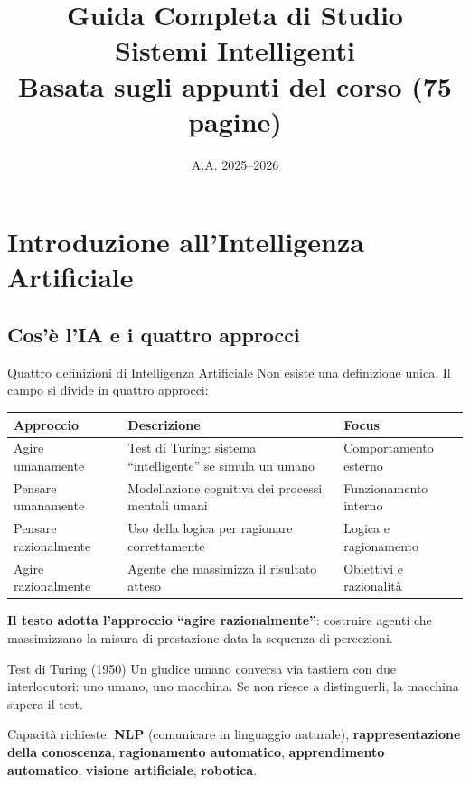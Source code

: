 \documentclass[12pt,a4paper]{article}
\title{\textbf{Guida Completa di Studio}\\[6pt]
{\large Sistemi Intelligenti}\\[4pt]
\normalsize Basata sugli appunti del corso (75 pagine)}
\author{}
\date{A.A. 2025--2026}
\begin{document}
\maketitle
\tableofcontents
\newpage

\section{Introduzione all'Intelligenza Artificiale}

\subsection{Cos'è l'IA e i quattro approcci}

\begin{defbox}{Quattro definizioni di Intelligenza Artificiale}
Non esiste una definizione unica. Il campo si divide in quattro approcci:

\begin{center}
\renewcommand{\arraystretch}{1.3}
\begin{tabular}{|p{3.5cm}|p{6cm}|p{3cm}|}
\hline
\textbf{Approccio} & \textbf{Descrizione} & \textbf{Focus} \\
\hline
Agire umanamente & Test di Turing: sistema ``intelligente'' se simula un umano & Comportamento esterno \\
\hline
Pensare umanamente & Modellazione cognitiva dei processi mentali umani & Funzionamento interno \\
\hline
Pensare razionalmente & Uso della logica per ragionare correttamente & Logica e ragionamento \\
\hline
Agire razionalmente & Agente che massimizza il risultato atteso & Obiettivi e razionalità \\
\hline
\end{tabular}
\end{center}

\textbf{Il testo adotta l'approccio ``agire razionalmente''}: costruire agenti che massimizzano la misura di prestazione data la sequenza di percezioni.
\end{defbox}

\begin{defbox}{Test di Turing (1950)}
Un giudice umano conversa via tastiera con due interlocutori: uno umano, uno macchina. Se non riesce a distinguerli, la macchina supera il test.

Capacità richieste: \textbf{NLP} (comunicare in linguaggio naturale), \textbf{rappresentazione della conoscenza}, \textbf{ragionamento automatico}, \textbf{apprendimento automatico}, \textbf{visione artificiale}, \textbf{robotica}.
\end{defbox}
\end{document}
